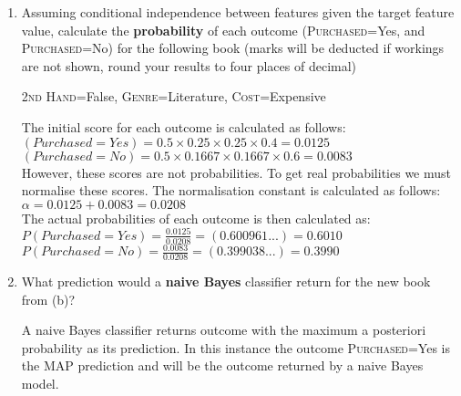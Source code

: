 \documentclass[--SOLUTION-OPTION--]{ditpaper}
\begin{document}
\begin{enumerate}
	\item Assuming conditional independence between features given the target feature value, calculate the \textbf{probability} of each outcome (\textsc{Purchased}=Yes, and \textsc{Purchased}=No) for the following book (marks will be deducted if workings are not shown, round your results to four places of decimal)\\
	\begin{center}
		\textsc{2nd Hand}=False, \textsc{Genre}=Literature, \textsc{Cost}=Expensive
	\end{center}
	\begin{answer}
		The initial score for each outcome is calculated as follows:\\
		$(Purchased=Yes) =  0.5 \times 0.25 \times 0.25 \times 0.4 = 0.0125$\\
		$(Purchased=No) =  0.5 \times 0.1667 \times 0.1667 \times 0.6 = 0.0083$\\
		However, these scores are not probabilities. To get real probabilities we must normalise these scores. The normalisation constant is calculated as follows:\\
		$\alpha=0.0125+0.0083=0.0208$\\
		The actual probabilities of each outcome is then calculated as:
		$P(Purchased=Yes) =  \frac{0.0125}{0.0208}=(0.600961...)=0.6010$ \\
		$P(Purchased=No) =  \frac{0.0083}{0.0208}=(0.399038...)=0.3990$\\
	\end{answer}

	\item What prediction would a \textbf{naive Bayes} classifier return for the new book from (b)?			
	\begin{answer}
		A naive Bayes classifier returns outcome with the maximum a posteriori probability as its prediction. In this instance the outcome \textsc{Purchased}=Yes is the MAP prediction and will be the outcome returned by a naive Bayes model.
	\end{answer}

\end{enumerate}
\end{document}
